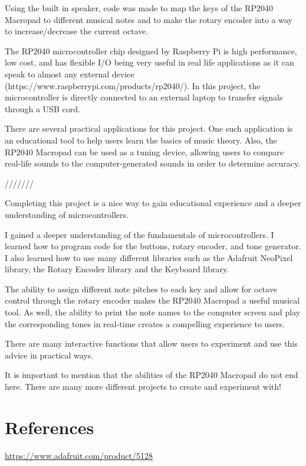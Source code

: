 \documentclass{article}
\begin{document}
Using the built in speaker, code was made to map the keys of the RP2040 Macropad to different musical notes and to make the rotary encoder into a way to increase/decrease the current octave.

The RP2040 microcontroller chip designed by Raspberry Pi is high performance, low cost, and has flexible I/O being very useful in real life applications as it can speak to almost any external device (https://www.raspberrypi.com/products/rp2040/). In this project, the microcontroller is directly connected to an external laptop to transfer signals through a USB cord. 

There are several practical applications for this project. One such application is an educational tool to help users learn the basics of music theory. Also, the RP2040 Macropad can be used as a tuning device, allowing users to compare real-life sounds to the computer-generated sounds in order to determine accuracy. 

///////

Completing this project is a nice way to gain educational experience and a deeper understanding of microcontrollers. 

I gained a deeper understanding of the fundamentals of microcontrollers. I learned how to program code for the buttons, rotary encoder, and tone generator. I also learned how to use many different libraries such as the Adafruit NeoPixel library, the Rotary Encoder library and the Keyboard library. 

The ability to assign different note pitches to each key and allow for octave control through the rotary encoder makes the RP2040 Macropad a useful musical tool. As well, the ability to print the note names to the computer screen and play the corresponding tones in real-time creates a compelling experience to users. 

There are many interactive functions that allow users to experiment and use this advice in practical ways. 

It is important to mention that the abilities of the RP2040 Macropad do not end here. There are many more different projects to create and experiment with!



\section{References}

\url{https://www.adafruit.com/product/5128}


\section{}

\end{document}
